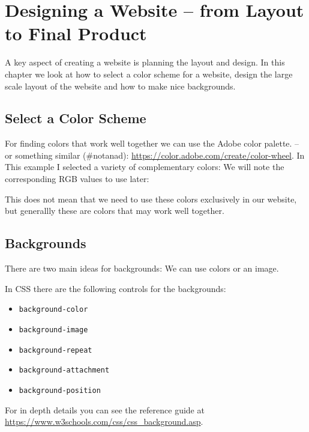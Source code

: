 \documentclass[english,11pt,a4paper]{report}
\begin{document}
\newpage

\section{Designing a Website -- from Layout to Final Product}

A key aspect of creating a website is planning the layout and design. In this chapter we look at how to select a color scheme for a website, design the large scale layout of the website and how to make nice backgrounds.

\subsection{Select a Color Scheme}
For finding colors that work well together we can use the Adobe color palette. -- or something similar (\#notanad): \url{https://color.adobe.com/create/color-wheel}.  In This example I selected a variety of complementary colors:
We will note the corresponding RGB values to use later: 



This does not mean that we need to use these colors exclusively in our website, but generallly these are colors that may work well together.

\subsection{Backgrounds}
There are two main ideas for backgrounds: We can use colors or an image. 

In CSS there are the following controls for the backgrounds: 
\begin{itemize}
\item \verb|background-color|
\item \verb|background-image|
\item \verb|background-repeat|
\item \verb|background-attachment|
\item \verb|background-position|
\end{itemize}
For in depth details you can see the reference guide at \url{https://www.w3schools.com/css/css_background.asp}. 
\end{document}
